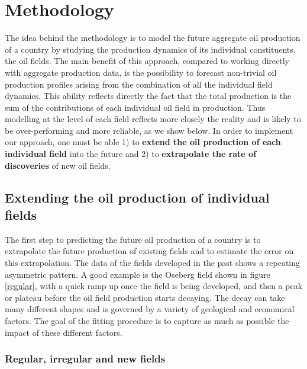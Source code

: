 \documentclass[review]{elsarticle}
\begin{document}
\section{Methodology}

The idea behind the methodology is to model the future aggregate oil
production of a country by studying the production dynamics of its
individual constituents, the oil fields. The main benefit of this
approach, compared to working directly with aggregate production data,
is the possibility to forecast non-trivial oil production profiles
arising from the combination of all the individual field
dynamics. This ability reflects directly the fact that the total
production is the sum of the contributions of each individual
oil field in production. Thus modelling at the level of each field
reflects more closely the reality and is likely to be over-performing
and more reliable, as we show below.
In order to implement our approach, one must be able 1) to \textbf{extend
the oil production of each individual field} into the future and 2)
to \textbf{extrapolate the rate of discoveries} of new oil fields.


\subsection{Extending the oil production of individual fields}

The first step to predicting the future oil production of a country
is to extrapolate the future production of existing fields and to
estimate the error on this extrapolation. The data of the fields developed
in the past shows a repeating asymmetric pattern. A good example is
the Oseberg field shown in figure \ref{regular}, with a quick ramp
up once the field is being developed, and then a peak or plateau before
the oil field production starts decaying. The decay can take many different shapes and is governed by a variety of geological and economical factors.
The goal of the fitting procedure is to capture as much as possible the impact of
these different factors.


\subsubsection{Regular, irregular and new fields\label{sub:Regular,-irregular-and}}
\end{document}
